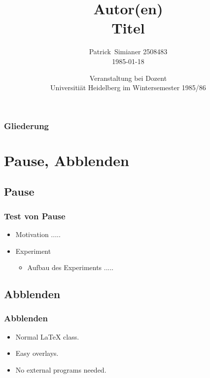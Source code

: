 \documentclass[ignorenonframetext]{beamer}
\title[ktitel]{Autor(en)\\ Titel}
\author{Patrick~Simianer \tiny 2508483\\\normalsize 1985-01-18}
\date{Veranstaltung bei Dozent\\ Universitiät Heidelberg im Wintersemester 1985/86}
\begin{document}
\frame[plain]{\titlepage}



\begin{frame}[plain]
    \frametitle{Gliederung}
    \tableofcontents
\end{frame}



\section{Pause, Abblenden}


\subsection{Pause}

\begin{frame}
    \frametitle{Test von Pause}

    \begin{itemize}
        \item Motivation 
        .....
        \pause
        \item Experiment
        \begin{itemize}
            \item Aufbau des Experiments
            .....
        \end{itemize}
    \end{itemize}
\end{frame}


\subsection{Abblenden}

\begin{frame}
    \frametitle{Abblenden}
    
    \begin{itemize}
        \item<1-> Normal LaTeX class.
        \item<2-> Easy overlays.
        \item<3-> No external programs needed.      
    \end{itemize}
\end{frame}
\end{document}
